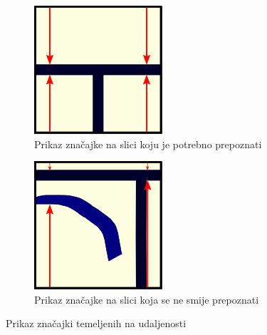 \documentclass[times, utf8, zavrsni, numeric]{fer}
\begin{document}
\begin{figure}[th!]
    \centering
    \begin{subfigure}{.5\textwidth}
        \centering
        \includegraphics[width=.45\linewidth]{Images/Feature_true_1.png}
        \captionsetup{justification=centering}
        \caption{Prikaz značajke na slici koju je potrebno prepoznati}
        \label{fig:featureDemo1a}
    \end{subfigure}%
    \begin{subfigure}{.5\textwidth}
        \centering
        \includegraphics[width=.45\linewidth]{Images/Feature_false_1.png}
        \captionsetup{justification=centering}
        \caption{Prikaz značajke na slici koja se ne smije prepoznati}
        \label{fig:featureDemo1b}
    \end{subfigure}
    \caption{Prikaz značajki temeljenih na udaljenosti}
    \label{fig:featureDemo1}
\end{figure}
\end{document}
